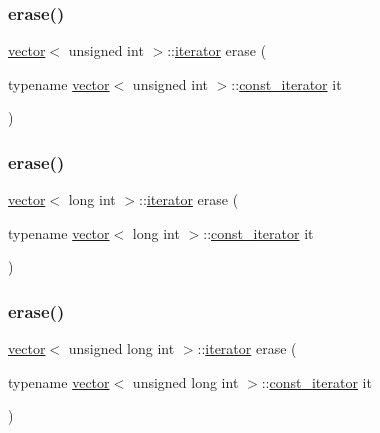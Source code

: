 \mbox{\label{classvector_afd5e956270cdd0c027040998cc1873e1}} 
\subsubsection{\texorpdfstring{erase()}{erase()}\hspace{0.1cm}{\footnotesize\ttfamily [9/28]}}
{\footnotesize\ttfamily \mbox{\hyperlink{classvector}{vector}}$<$ unsigned int $>$\+::\mbox{\hyperlink{classvector_a35c955cacac6aacaa1e82874b1628865}{iterator}} erase (\begin{DoxyParamCaption}\item[{typename \mbox{\hyperlink{classvector}{vector}}$<$ unsigned int $>$\+::\mbox{\hyperlink{classvector_a2fc97dce62b7053449cc868607540dba}{const\+\_\+iterator}}}]{it }\end{DoxyParamCaption})}

\mbox{\label{classvector_a9ce1edb3994fea8a0679228da3b03e37}} 
\subsubsection{\texorpdfstring{erase()}{erase()}\hspace{0.1cm}{\footnotesize\ttfamily [10/28]}}
{\footnotesize\ttfamily \mbox{\hyperlink{classvector}{vector}}$<$ long int $>$\+::\mbox{\hyperlink{classvector_a35c955cacac6aacaa1e82874b1628865}{iterator}} erase (\begin{DoxyParamCaption}\item[{typename \mbox{\hyperlink{classvector}{vector}}$<$ long int $>$\+::\mbox{\hyperlink{classvector_a2fc97dce62b7053449cc868607540dba}{const\+\_\+iterator}}}]{it }\end{DoxyParamCaption})}

\mbox{\label{classvector_a07d1a32387ef4a6e29dda38d879354eb}} 
\subsubsection{\texorpdfstring{erase()}{erase()}\hspace{0.1cm}{\footnotesize\ttfamily [11/28]}}
{\footnotesize\ttfamily \mbox{\hyperlink{classvector}{vector}}$<$ unsigned long int $>$\+::\mbox{\hyperlink{classvector_a35c955cacac6aacaa1e82874b1628865}{iterator}} erase (\begin{DoxyParamCaption}\item[{typename \mbox{\hyperlink{classvector}{vector}}$<$ unsigned long int $>$\+::\mbox{\hyperlink{classvector_a2fc97dce62b7053449cc868607540dba}{const\+\_\+iterator}}}]{it }\end{DoxyParamCaption})}

